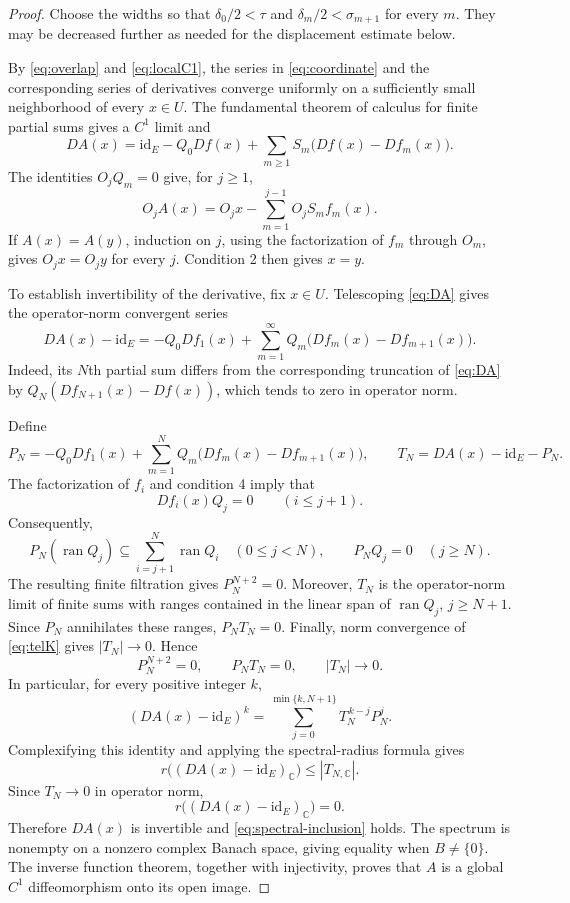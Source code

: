 \documentclass[11pt]{article}
\newcommand{\id}{\mathrm{id}}
\begin{document}
\begin{proof}
Choose the widths so that
$\delta_0/2<\tau$ and
$\delta_m/2<\sigma_{m+1}$ for every $m$.
They may be decreased further as needed for
the displacement estimate below.

By \eqref{eq:overlap} and \eqref{eq:localC1},
the series in \eqref{eq:coordinate} and the
corresponding series of derivatives converge
uniformly on a sufficiently small neighborhood
of every $x\in U$. The fundamental
theorem of calculus for finite partial sums
gives a $C^1$ limit and
\begin{equation}\label{eq:DA}
 DA(x)=\id_E-Q_0Df(x)+\sum_{m\ge1}S_m
 \bigl(Df(x)-Df_m(x)\bigr).
\end{equation}
The identities $O_jQ_m=0$ give, for $j\ge1$,
\begin{equation}\label{eq:triangle}
 O_jA(x)=O_jx-\sum_{m=1}^{j-1}
 O_jS_m f_m(x).
\end{equation}
If $A(x)=A(y)$, induction on $j$, using the
factorization of $f_m$ through $O_m$, gives
$O_jx=O_jy$ for every $j$. Condition 2
then gives $x=y$.


To establish invertibility of the derivative,
fix $x\in U$. Telescoping \eqref{eq:DA}
gives the operator-norm convergent series
\begin{equation}\label{eq:telK}
DA(x)-\id_E
=-Q_0Df_1(x)
+\sum_{m=1}^{\infty}
Q_m\bigl(Df_m(x)-Df_{m+1}(x)\bigr).
\end{equation}
Indeed, its $N$th partial sum differs from
the corresponding truncation of \eqref{eq:DA}
by $Q_N(Df_{N+1}(x)-Df(x))$, which tends to
zero in operator norm.

Define
\[
P_N=-Q_0Df_1(x)
+\sum_{m=1}^{N}
Q_m\bigl(Df_m(x)-Df_{m+1}(x)\bigr),
\qquad
T_N=DA(x)-\id_E-P_N.
\]
The factorization of $f_i$ and condition 4
imply that
\[
Df_i(x)Q_j=0
\qquad(i\le j+1).
\]
Consequently,
\[
P_N(\operatorname{ran}Q_j)
\subseteq
\sum_{i=j+1}^{N}\operatorname{ran}Q_i
\quad(0\le j<N),
\qquad
P_NQ_j=0\quad(j\ge N).
\]
The resulting finite filtration gives
$P_N^{N+2}=0$. Moreover, $T_N$ is the
operator-norm limit of finite sums with ranges
contained in the linear span of
$\operatorname{ran}Q_j$, $j\ge N+1$.
Since $P_N$ annihilates these ranges,
$P_NT_N=0$. Finally, norm convergence of
\eqref{eq:telK} gives $|T_N|\to0$. Hence
\begin{equation}\label{eq:nilpotent}
P_N^{N+2}=0,\qquad
P_NT_N=0,\qquad
|T_N|\longrightarrow0.
\end{equation}
In particular, for every positive integer $k$,
\[
(DA(x)-\id_E)^k
=\sum_{j=0}^{\min\{k,N+1\}}
T_N^{\,k-j}P_N^j.
\]
Complexifying this identity and applying
the spectral-radius formula gives
\[
r\bigl((DA(x)-\id_E)_{\mathbb C}\bigr)
\le |T_{N,\mathbb C}|.
\]
Since $T_N\to0$ in operator norm,
\[
r\bigl((DA(x)-\id_E)_{\mathbb C}\bigr)=0.
\]
Therefore $DA(x)$ is invertible and
\eqref{eq:spectral-inclusion} holds.
The spectrum is nonempty on a nonzero
complex Banach space, giving equality
when $B\ne\{0\}$. The inverse function
theorem, together with injectivity,
proves that $A$ is a global $C^1$
diffeomorphism onto its open image.


\end{proof}
\end{document}

